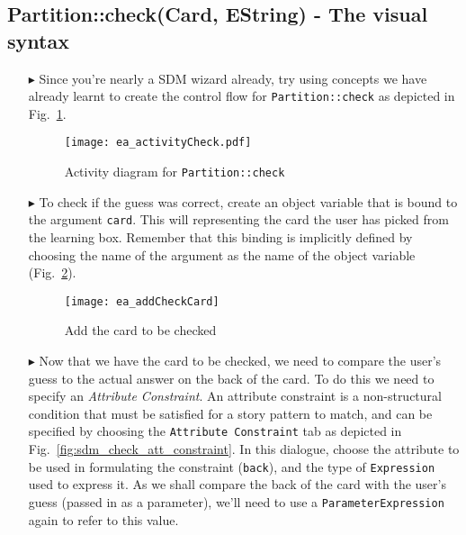 \newpage
\subsection{Partition::check(Card, EString) - The visual syntax}
\visHeader
\hypertarget{checkCard vis}{}

\begin{itemize}

\item[$\blacktriangleright$] Since you're nearly a SDM wizard already, try using concepts we have already learnt to create the control flow for
\texttt{Partition::check} as depicted in Fig.~\ref{fig:sdm_check_start}.

\begin{figure}[htbp]
\begin{center}
  \texttt{[image: ea\_activityCheck.pdf]}
  \caption{Activity diagram for \texttt{Partition::check}}
  \label{fig:sdm_check_start}
\end{center}
\end{figure}

\item[$\blacktriangleright$] To check if the guess was correct, create an object variable that is bound to the argument \texttt{card}. This will
representing the card the user has picked from the learning box. Remember that this binding is implicitly defined by choosing the name of the argument as the
name of the object variable (Fig.~\ref{fig:sdm_check_addCard}).

\begin{figure}[htbp]
\begin{center}
  \texttt{[image: ea\_addCheckCard]}
  \caption{Add the card to be checked}
  \label{fig:sdm_check_addCard}
\end{center}
\end{figure}

\item[$\blacktriangleright$] Now that we have the card to be checked, we need to compare the user's guess to the actual answer on the
back of the card. To do this we need to specify an \emph{Attribute Constraint}. An attribute constraint is a non-structural condition that must be satisfied for
a story pattern to match, and can be specified by choosing the \texttt{Attribute Constraint} tab as depicted in Fig.~\ref{fig:sdm_check_att_constraint}. In this
dialogue, choose the attribute to be used in formulating the constraint (\texttt{back}), and the type of \texttt{Expression} used to express it. As we shall
compare the back of the card with the user's guess (passed in as a parameter), we'll need to use a \texttt{ParameterExpression} again to refer to this value.


\end{itemize}
